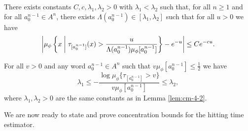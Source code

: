 \begin{lemma}\label{lem:cm-4-2}
	There exists constants $C, c, \lambda_1, \lambda_2 > 0$ with $\lambda_1 < \lambda_2$ such that, for all $n \geq 1$ and for all $a_0^{n - 1} \in A^n$, there exists $\Lambda(a_0^{n - 1}) \in [\lambda_1, \lambda_2]$ such that for all $u > 0$ we have
	\[
		\left| \mu_\phi\left\{x \mathrel{}\middle|\mathrel{} \tau_{[a_0^{n - 1}]}(x) > \frac{u}{\Lambda(a_0^{n - 1}) \mu_\phi[a_0^{n - 1}]}\right\} - e^{-u} \right| \leq Ce^{-cu}.
	\]
\end{lemma}

\begin{lemma}\label{lem:cm-4-3}
	For all $v > 0$ and any word $a_0^{n - 1} \in A^n$ such that $v\mu_\phi[a_0^{n - 1}] \leq \frac{1}{2}$ we have
	\[
		\lambda_1 \leq -\frac{\log{\mu_\phi\{\tau_{[a_0^{n - 1}]} > v\}}}{v\mu_\phi[a_0^{n - 1}]} \leq \lambda_2,
	\]
	where $\lambda_1, \lambda_2 > 0$ are the same constants as in Lemma \ref{lem:cm-4-2}.
\end{lemma}

We are now ready to state and prove concentration bounds for the hitting time estimator.

